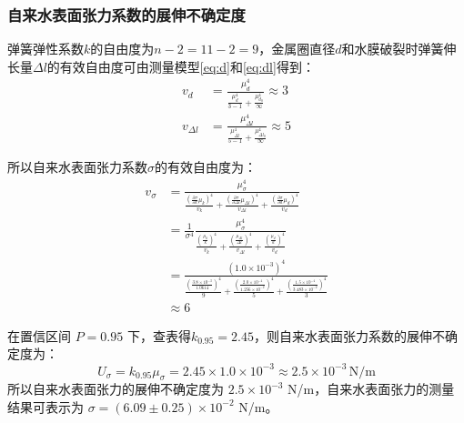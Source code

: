\documentclass[a4paper]{extarticle}
\begin{document}
    \subsubsection{自来水表面张力系数的展伸不确定度}
    \hspace{2em}
    弹簧弹性系数$k$的自由度为$n-2=11-2=9$，金属圈直径$d$和水膜破裂时弹簧伸长量$\Delta l$的有效自由度可由测量模型\ref{eq:d}和\ref{eq:dl}得到：
    \begin{equation*}
        \begin{aligned}
            v_d&=\frac{\mu_d^4}{\frac{\mu_{\overline{d}}^4}{3-1}+\frac{\mu_{d_0}^4}{\infty}}\approx3\\
            v_{\Delta l}&=\frac{\mu_{\Delta l}^4}{\frac{\mu_{\overline{\Delta l}}^4}{5-1}+\frac{\mu_{\Delta l_0}^4}{\infty}}\approx5
        \end{aligned}
    \end{equation*}
    \par\hspace{2em}
    所以自来水表面张力系数$\sigma$的有效自由度为：
    \begin{equation*}
        \begin{aligned}
            v_{\sigma} &= \frac{\mu_{\sigma}^4}{\frac{\left(\frac{\partial\sigma}{\partial k}\mu_k\right)^4}{v_k}+\frac{\left(\frac{\partial\sigma}{\partial \Delta l}\mu_{\Delta l}\right)^4}{v_{\Delta l}}+\frac{\left(\frac{\partial\sigma}{\partial d}\mu_d\right)^4}{v_d}}\\
            &= \frac{1}{\sigma^4}\frac{\mu_{\sigma}^4}{\frac{\left(\frac{\mu_k}{k}\right)^4}{v_k}+\frac{\left(\frac{\mu_{\Delta l}}{\Delta l}\right)^4}{v_{\Delta l}}+\frac{\left(\frac{\mu_d}{d}\right)^4}{v_d}}\\
            &= \frac{(1.0\times10^{-3})^4}{\frac{\left(\frac{3.8\times10^{-3}}{1.0614}\right)^4}{9}+\frac{\left(\frac{2.0\times10^{-4}}{1.256\times10^{-2}}\right)^4}{5}+\frac{\left(\frac{1.5\times10^{-4}}{3.483\times10^{-2}}\right)^4}{3}}\\
            &\approx 6
        \end{aligned}
    \end{equation*}
    \par\hspace{2em}
    在置信区间 $P=0.95$ 下，查表得$k_{0.95}=2.45$，则自来水表面张力系数的展伸不确定度为：
    \begin{equation*}
        U_{\sigma}=k_{0.95}\mu_{\sigma}=2.45\times1.0\times10^{-3}\approx2.5\times10^{-3}\,\text{N/m}
    \end{equation*}
    所以自来水表面张力的展伸不确定度为 $2.5\times10^{-3}$ N/m，自来水表面张力的测量结果可表示为 $\sigma = (6.09\pm0.25)\times10^{-2}$ N/m。
\end{document}

